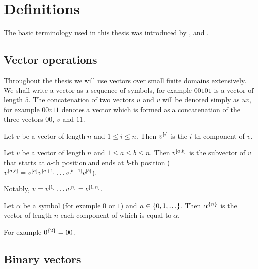 \chapter{Definitions}

The basic terminology used in this thesis
was introduced by \citet{Schieber2005154},
\citet{Dubovsky2012}
and \citet{Husek2014, Husek2015}.

\section{Vector operations}

Throughout the thesis we will use vectors
over small finite domains extensively.
We shall write a vector as a sequence of symbols,
for example $00101$ is a vector of length $5$.
The concatenation of two vectors $u$ and $v$
will be denoted simply as $uv$,
for example $00v11$ denotes a vector
which is formed as a concatenation
of the three vectors $00$, $v$ and $11$.

\begin{definition}
Let $v$ be a vector of length $n$ and $1 \leq i \leq n$.
Then $v^{[i]}$ is the $i$-th component of $v$.
\end{definition}

\begin{definition}
Let
$v$ be a vector of length $n$
and
$1 \leq a \leq b \leq n$.
Then $v^{[a, b]}$ is the subvector of $v$
that starts at $a$-th position
and ends at $b$-th position
($v^{[a, b]}
= v^{[a]} v^{[a+1]}
\ldots v^{[b-1]} v^{[b]}$).
\end{definition}

Notably,
$v = v^{[1]} \ldots v^{[n]} = v^{[1, n]}$.

\begin{definition}
Let $\alpha$ be a symbol (for example $0$ or $1$)
and $n \in \{0, 1, \ldots\}$.
Then $\alpha^{\{n\}}$ is the vector of length $n$
each component of which is equal to $\alpha$.
\end{definition}

For example
$0^{\{2\}} = 00$.

\section{Binary vectors}

